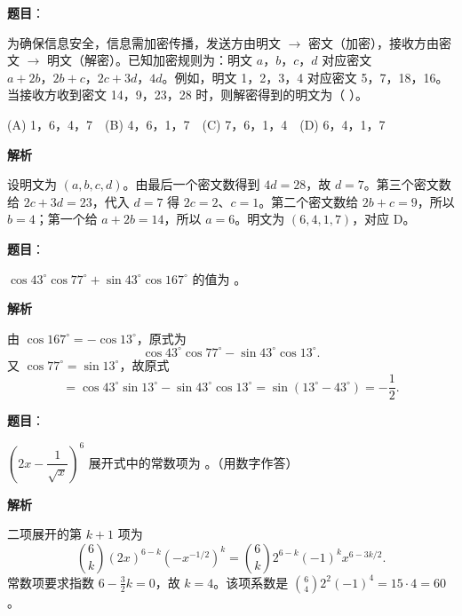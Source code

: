 \begin{answer}

\textbf{题目}：

为确保信息安全，信息需加密传播，发送方由明文 \(\to\) 密文（加密），接收方由密文 \(\to\) 明文（解密）。已知加密规则为：明文 $a\text{，}b\text{，}c\text{，}d$ 对应密文 $a+2b\text{，}2b+c\text{，}2c+3d\text{，}4d$。例如，明文 1，2，3，4 对应密文 5，7，18，16。当接收方收到密文 14，9，23，28 时，则解密得到的明文为（ ）。

(A) 1，6，4，7　(B) 4，6，1，7　(C) 7，6，1，4　(D) 6，4，1，7

\textbf{解析}

设明文为 $(a,b,c,d)$。由最后一个密文数得到 $4d=28$，故 $d=7$。第三个密文数给 $2c+3d=23$，代入 $d=7$ 得 $2c=2$、$c=1$。第二个密文数给 $2b+c=9$，所以 $b=4$；第一个给 $a+2b=14$，所以 $a=6$。明文为 $(6,4,1,7)$，对应 D。


\end{answer}
\begin{answer}

\textbf{题目}：

\(\cos43^\circ\cos77^\circ+\sin43^\circ\cos167^\circ\) 的值为 \gkblank{}。

\textbf{解析}

由 $\cos167^\circ=-\cos13^\circ$，原式为
\nopagebreak[4]
\[
\cos43^\circ\cos77^\circ-\sin43^\circ\cos13^\circ.
\]
又 $\cos77^\circ=\sin13^\circ$，故原式
\nopagebreak[4]
\[
=\cos43^\circ\sin13^\circ-\sin43^\circ\cos13^\circ
=\sin(13^\circ-43^\circ)=-\frac12.
\]


\end{answer}
\begin{answer}

\textbf{题目}：

\(\left(2x-\dfrac1{\sqrt{x}}\right)^6\) 展开式中的常数项为 \gkblank{}。（用数字作答）

\textbf{解析}

二项展开的第 $k+1$ 项为
\nopagebreak[4]
\[
\binom6k(2x)^{6-k}\left(-x^{-1/2}\right)^k
=\binom6k2^{6-k}(-1)^k x^{6-3k/2}.
\]
常数项要求指数 $6-\tfrac32k=0$，故 $k=4$。该项系数是 $\binom64 2^2(-1)^4=15\cdot4=60$。


\end{answer}
